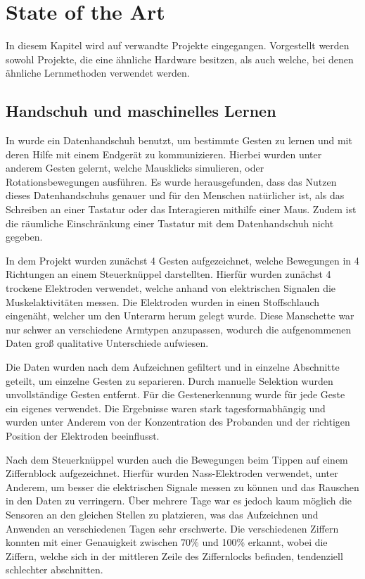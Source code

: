 \chapter{State of the Art}
In diesem Kapitel wird auf verwandte Projekte eingegangen. Vorgestellt werden sowohl Projekte, die eine ähnliche Hardware besitzen, als auch welche, bei denen ähnliche Lernmethoden verwendet werden.

\section{Handschuh und maschinelles Lernen}

In  \citep{hand_data_glove} wurde ein Datenhandschuh benutzt, um bestimmte Gesten zu lernen und mit deren Hilfe mit einem Endgerät zu kommunizieren. Hierbei wurden unter anderem Gesten gelernt, welche Mausklicks simulieren, oder Rotationsbewegungen ausführen. Es wurde herausgefunden, dass das Nutzen dieses Datenhandschuhs genauer und für den Menschen natürlicher ist, als das Schreiben an einer Tastatur oder das Interagieren mithilfe einer Maus. Zudem ist die räumliche Einschränkung einer Tastatur mit dem Datenhandschuh nicht gegeben.


In dem Projekt  \citep{nasa-joystick-keyboard} wurden zunächst 4 Gesten aufgezeichnet, welche Bewegungen in 4 Richtungen an einem Steuerknüppel darstellten. Hierfür wurden zunächst 4 trockene Elektroden verwendet, welche anhand von elektrischen Signalen die Muskelaktivitäten messen. Die Elektroden wurden in einen Stoffschlauch eingenäht, welcher um den Unterarm herum gelegt wurde. Diese Manschette war nur schwer an verschiedene Armtypen anzupassen, wodurch die aufgenommenen Daten groß qualitative Unterschiede aufwiesen.

Die Daten wurden nach dem Aufzeichnen gefiltert und in einzelne Abschnitte geteilt, um einzelne Gesten zu separieren. Durch manuelle Selektion wurden unvollständige Gesten entfernt. Für die Gestenerkennung wurde für jede Geste ein eigenes  \citep[HMM;][]{hmm} verwendet. Die Ergebnisse waren stark tagesformabhängig und wurden unter Anderem von der Konzentration des Probanden und der richtigen Position der Elektroden beeinflusst.

Nach dem Steuerknüppel wurden auch die Bewegungen beim Tippen auf einem Ziffernblock aufgezeichnet. Hierfür wurden Nass-Elektroden verwendet, unter Anderem, um besser die elektrischen Signale messen zu können und das Rauschen in den Daten zu verringern. Über mehrere Tage war es jedoch kaum möglich die Sensoren an den gleichen Stellen zu platzieren, was das Aufzeichnen und Anwenden an verschiedenen Tagen sehr erschwerte. Die verschiedenen Ziffern konnten mit einer Genauigkeit zwischen 70\% und 100\% erkannt, wobei die Ziffern, welche sich in der mittleren Zeile des Ziffernlocks befinden, tendenziell schlechter abschnitten.

